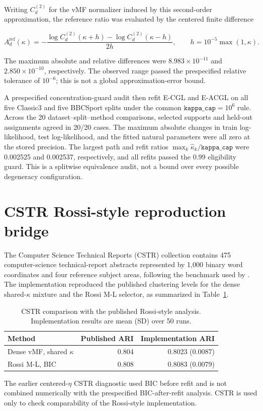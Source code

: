 \documentclass[preprint,12pt,authoryear]{elsarticle}
\begin{document}
Writing $C_d^{(2)}$ for the vMF normalizer induced by this second-order
approximation, the reference ratio was evaluated by the centered finite
difference

\[
A_d^{\mathrm{ref}}(\kappa)
=-
\frac{\log C_d^{(2)}(\kappa+h)-\log C_d^{(2)}(\kappa-h)}{2h},
\qquad
h=10^{-5}\max(1,\kappa).
\]

The maximum absolute and relative differences were
$8.983\times10^{-11}$ and $2.850\times10^{-10}$, respectively. The observed
range passed the prespecified relative tolerance of $10^{-6}$; this is not a
global approximation-error bound.

A prespecified concentration-guard audit then refit E-CGL and E-ACGL on all five
Classic3 and five BBCSport splits under the common
$\texttt{kappa\_cap}=10^6$ rule. Across the 20 dataset--split--method
comparisons, selected supports and held-out assignments agreed in 20/20
cases. The maximum absolute changes in train log-likelihood, test
log-likelihood, and the fitted natural parameters were all zero at the stored
precision. The largest path and refit ratios
$\max_k\widehat\kappa_k/\texttt{kappa\_cap}$ were 0.002525 and 0.002537,
respectively, and all refits passed the 0.99 eligibility guard. This is a
splitwise equivalence audit, not a bound over every possible degeneracy
configuration.

\section{CSTR Rossi-style reproduction bridge}
\label{sec:s-cstr-bridge}

The Computer Science Technical Reports (CSTR) collection contains 475
computer-science technical-report abstracts represented by
1,000 binary word coordinates and four reference subject areas, following the
benchmark used by \citet{rossi2022sparsevmf}. The implementation reproduced
the published clustering levels for the dense shared-$\kappa$ mixture and the
Rossi M-L selector, as summarized in Table~\ref{tab:s-cstr-bridge}.

\begin{table}[H]
\centering
\small
\caption{CSTR comparison with the published Rossi-style analysis.
Implementation results are mean (SD) over 50 runs.}
\label{tab:s-cstr-bridge}
\begin{tabular}{lrr}
\toprule
Method & Published ARI & Implementation ARI \\
\midrule
Dense vMF, shared $\kappa$ & 0.804 & 0.8023 (0.0087) \\
Rossi M-L, BIC & 0.808 & 0.8083 (0.0079) \\
\bottomrule
\end{tabular}
\end{table}

The earlier centered-$\eta$ CSTR diagnostic used BIC before refit and is not
combined numerically with the prespecified BIC-after-refit analysis. CSTR is used only to
check comparability of the Rossi-style implementation.



\end{document}
